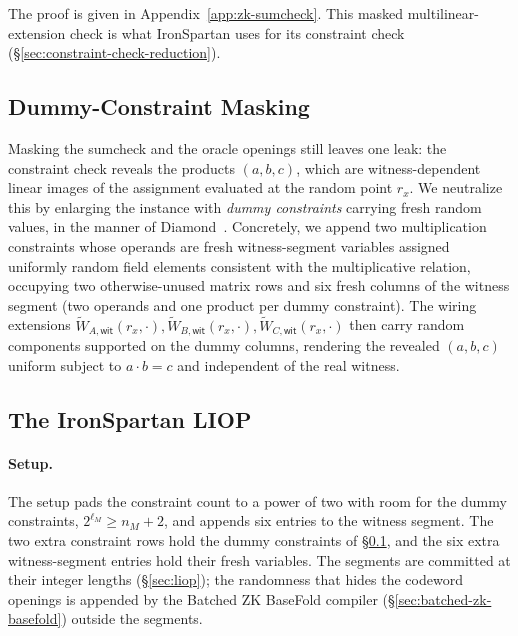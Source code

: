 \documentclass{article}
\theoremstyle{definition}
\newcommand*{\mle}{\widetilde}
\begin{document}
The proof is given in Appendix~\ref{app:zk-sumcheck}. This masked multilinear-extension check is what IronSpartan uses for its constraint check (\S\ref{sec:constraint-check-reduction}).

\subsection{Dummy-Constraint Masking}
\label{sec:dummy-masking}

Masking the sumcheck and the oracle openings still leaves one leak: the constraint check reveals the products $(a, b, c)$, which are witness-dependent linear images of the assignment evaluated at the random point $r_x$. We neutralize this by enlarging the instance with \emph{dummy constraints} carrying fresh random values, in the manner of Diamond~\cite{Diamond:2025ac}. Concretely, we append two multiplication constraints whose operands are fresh witness-segment variables assigned uniformly random field elements consistent with the multiplicative relation, occupying two otherwise-unused matrix rows and six fresh columns of the witness segment (two operands and one product per dummy constraint). The wiring extensions $\mle{W}_{A, \textsf{wit}}(r_x, \cdot), \mle{W}_{B, \textsf{wit}}(r_x, \cdot), \mle{W}_{C, \textsf{wit}}(r_x, \cdot)$ then carry random components supported on the dummy columns, rendering the revealed $(a, b, c)$ uniform subject to $a \cdot b = c$ and independent of the real witness.

\subsection{The IronSpartan LIOP}
\label{sec:ironspartan-liop}

\paragraph{Setup.}
The setup pads the constraint count to a power of two with room for the dummy constraints, $2^{\ell_M} \ge n_M + 2$, and appends six entries to the witness segment. The two extra constraint rows hold the dummy constraints of \S\ref{sec:dummy-masking}, and the six extra witness-segment entries hold their fresh variables. The segments are committed at their integer lengths (\S\ref{sec:liop}); the randomness that hides the codeword openings is appended by the Batched ZK BaseFold compiler (\S\ref{sec:batched-zk-basefold}) outside the segments.
\end{document}
